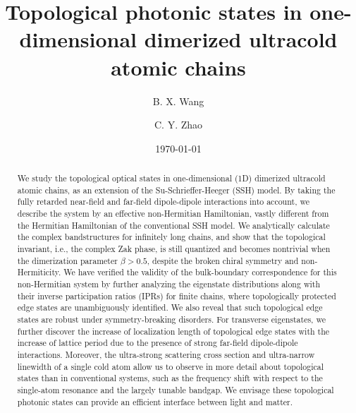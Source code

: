 \documentclass[aps,pra,reprint,groupedaddress,nofootinbib,longbibliography,showpacs]{revtex4-1}
\begin{document}
\title{Topological photonic states in one-dimensional dimerized ultracold atomic chains}

\author{B. X. Wang}
\author{C. Y. Zhao}

\date{\today}

\begin{abstract}
We study the topological optical states in one-dimensional (1D) dimerized ultracold atomic chains, as an extension of the Su-Schrieffer-Heeger (SSH) model. By taking the fully retarded near-field and far-field dipole-dipole interactions into account, we describe the system by an effective non-Hermitian Hamiltonian, vastly different from the Hermitian Hamiltonian of the conventional SSH model. We analytically calculate the complex bandstructures for infinitely long chains, and show that the topological invariant, i.e., the complex Zak phase, is still quantized and becomes nontrivial when the dimerization parameter $\beta>0.5$, despite the broken chiral symmetry and non-Hermiticity. We have verified the validity of the bulk-boundary correspondence for this non-Hermitian system by further analyzing the eigenstate distributions along with their inverse participation ratios (IPRs) for finite chains, where topologically protected edge states are unambiguously identified. We also reveal that such topological edge states are robust under symmetry-breaking disorders. For transverse eigenstates, we further discover the increase of localization length of topological edge states with the increase of lattice period due to the presence of strong far-field dipole-dipole interactions. Moreover, the ultra-strong scattering cross section and ultra-narrow linewidth of a single cold atom allow us to observe in more detail about topological states than in conventional systems, such as the frequency shift with respect to the single-atom resonance and the largely tunable bandgap. We envisage these topological photonic states can provide an efficient interface between light and matter. 
\end{abstract}
\maketitle
\end{document}
